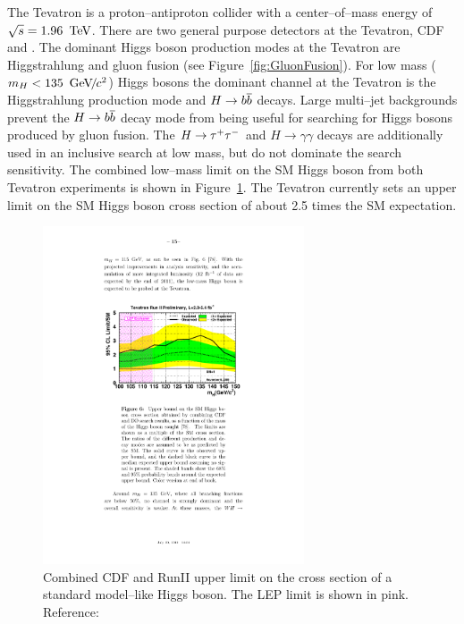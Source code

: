 The Tevatron is a proton--antiproton collider with a center--of--mass energy of
$\sqrt s = 1.96~\,\text{Te\hspace{-.08em}V}$.  There are two general purpose detectors at the Tevatron,
CDF and \DZERO\@. The dominant Higgs boson production modes at the Tevatron are
Higgstrahlung and gluon fusion (see Figure~\ref{fig:GluonFusion}).  For low mass
\mbox{($m_H < 135~{\,\text{Ge\hspace{-.08em}V\hspace{-0.16em}/\hspace{-0.08em}}c^\text{2}}$)} Higgs bosons the dominant channel at the Tevatron is
the Higgstrahlung production mode and \mbox{$H\to{b\overline{b}}$} decays.  Large
multi--jet backgrounds prevent the \mbox{$H\to{b\overline{b}}$} decay mode from being
useful for searching for Higgs bosons produced by gluon fusion.  The $H\to\tau^+\tau^-$
and $H \to \gamma \gamma$ decays are additionally used in an inclusive search at
low mass, but do not dominate the search sensitivity.  The combined low--mass
limit on the SM Higgs boson from both Tevatron experiments is shown in
Figure~\ref{fig:TevatronLowMassHiggsLimit}.  The Tevatron currently sets an
upper limit on the SM Higgs boson cross section of about 2.5 times the SM
expectation.
\begin{figure}
  \centering
  \includegraphics[height=100mm,angle=00]{theory_chapter/figures/tevatron_low_mass_sm_higgs_limit.pdf}
  \caption[Tevatron low mass standard model Higgs boson limit plot]{Combined CDF and
  \DZERO RunII upper limit on the cross section of a standard model--like Higgs
  boson.  The LEP limit is shown in pink. Reference:~\cite{PDG}}
  \label{fig:TevatronLowMassHiggsLimit}
\end{figure}

